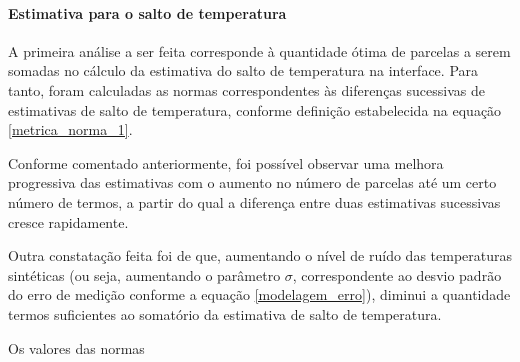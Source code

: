 \paragraph{Estimativa para o salto de temperatura}

A primeira análise a ser feita corresponde à quantidade ótima de parcelas a serem somadas no cálculo da estimativa do salto de temperatura na interface. Para tanto, foram calculadas as normas correspondentes às diferenças sucessivas de estimativas de salto de temperatura, conforme definição estabelecida na equação \eqref{metrica_norma_1}.

Conforme comentado anteriormente, foi possível observar uma melhora progressiva das estimativas com o aumento no número de parcelas até um certo número de termos, a partir do qual a diferença entre duas estimativas sucessivas cresce rapidamente.

Outra constatação feita foi de que, aumentando o nível de ruído das temperaturas sintéticas (ou seja, aumentando o parâmetro $\sigma$, correspondente ao desvio padrão do erro de medição conforme a equação \eqref{modelagem_erro}), diminui a quantidade termos suficientes ao somatório da estimativa de salto de temperatura.

Os valores das normas 






